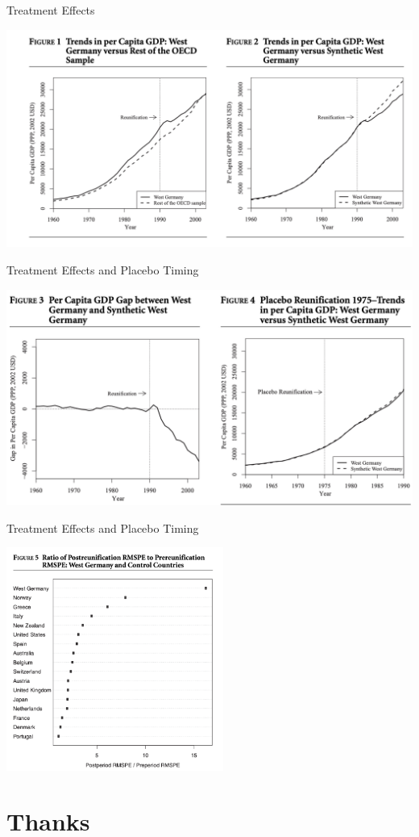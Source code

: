 \documentclass[xcolor=pdftex,dvipsnames,table,mathserif,aspectratio=169]{beamer}
\begin{document}
\begin{frame}{Treatment Effects}
\begin{center}
\includegraphics[width=5.5in]{./resources/germany_3.png}
\end{center}
\end{frame}


\begin{frame}{Treatment Effects and Placebo Timing}
\begin{center}
\includegraphics[width=5.5in]{./resources/germany_4.png}
\end{center}
\end{frame}

\begin{frame}{Treatment Effects and Placebo Timing}
\begin{center}
\includegraphics[width=2.8in]{./resources/germany_5.png}
\end{center}
\end{frame}

\section{Thanks}
\end{document}
